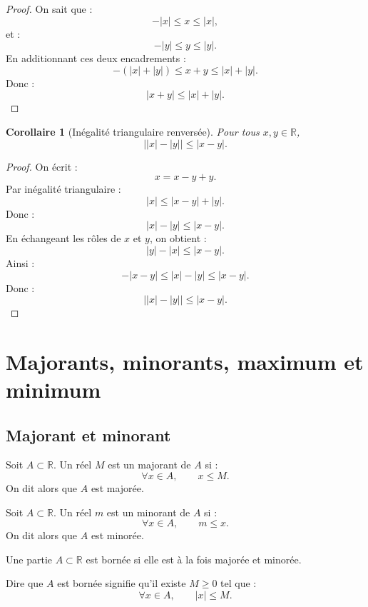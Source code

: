 \documentclass[11pt,a4paper]{article}
\newcommand{\R}{\mathbb R}
\newcommand{\abs}[1]{\left|#1\right|}
\newtheorem{corollaire}[prop]{Corollaire}
\begin{document}
\begin{proof}
On sait que :
\[
-\abs{x}\leq x\leq \abs{x},
\]
et :
\[
-\abs{y}\leq y\leq \abs{y}.
\]
En additionnant ces deux encadrements :
\[
-(\abs{x}+\abs{y})\leq x+y\leq \abs{x}+\abs{y}.
\]
Donc :
\[
\abs{x+y}\leq \abs{x}+\abs{y}.
\]
\end{proof}

\begin{corollaire}[Inégalité triangulaire renversée]
Pour tous \(x,y\in\R\),
\[
\bigl|\abs{x}-\abs{y}\bigr|\leq \abs{x-y}.
\]
\end{corollaire}

\begin{proof}
On écrit :
\[
x=x-y+y.
\]
Par inégalité triangulaire :
\[
\abs{x}\leq \abs{x-y}+\abs{y}.
\]
Donc :
\[
\abs{x}-\abs{y}\leq \abs{x-y}.
\]
En échangeant les rôles de \(x\) et \(y\), on obtient :
\[
\abs{y}-\abs{x}\leq \abs{x-y}.
\]
Ainsi :
\[
-\abs{x-y}\leq \abs{x}-\abs{y}\leq \abs{x-y}.
\]
Donc :
\[
\bigl|\abs{x}-\abs{y}\bigr|\leq \abs{x-y}.
\]
\end{proof}

\section{Majorants, minorants, maximum et minimum}

\subsection{Majorant et minorant}

\begin{definitionbox}[Majorant]
Soit \(A\subset\R\).  
Un réel \(M\) est un majorant de \(A\) si :
\[
\forall x\in A,\qquad x\leq M.
\]
On dit alors que \(A\) est majorée.
\end{definitionbox}

\begin{definitionbox}[Minorant]
Soit \(A\subset\R\).  
Un réel \(m\) est un minorant de \(A\) si :
\[
\forall x\in A,\qquad m\leq x.
\]
On dit alors que \(A\) est minorée.
\end{definitionbox}

\begin{definitionbox}
Une partie \(A\subset\R\) est bornée si elle est à la fois majorée et minorée.
\end{definitionbox}

\begin{retenirbox}
Dire que \(A\) est bornée signifie qu'il existe \(M\geq0\) tel que :
\[
\forall x\in A,\qquad \abs{x}\leq M.
\]
\end{retenirbox}
\end{document}

